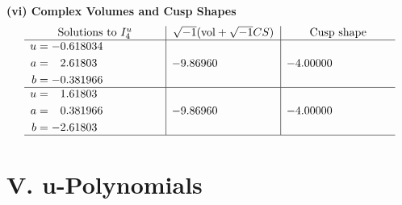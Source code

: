 \documentclass[1p]{elsarticle_modified}
\theoremstyle{definition}
\newcommand{\I}{\sqrt{-1}}
\begin{document}
\newpage\flushleft \textbf{(vi) Complex Volumes and Cusp Shapes}
$$\begin{array}{c|c|c}  
\text{Solutions to }I^u_{4}& \I (\text{vol} + \sqrt{-1}CS) & \text{Cusp shape}\\
 \hline 
\begin{aligned}
u &= -0.618034\phantom{ +0.000000I} \\
a &= \phantom{-}2.61803\phantom{ +0.000000I} \\
b &= -0.381966\phantom{ +0.000000I}\end{aligned}
 & -9.86960\phantom{ +0.000000I} & -4.00000\phantom{ +0.000000I} \\ \hline\begin{aligned}
u &= \phantom{-}1.61803\phantom{ +0.000000I} \\
a &= \phantom{-}0.381966\phantom{ +0.000000I} \\
b &= -2.61803\phantom{ +0.000000I}\end{aligned}
 & -9.86960\phantom{ +0.000000I} & -4.00000\phantom{ +0.000000I}\\
 \hline 
 \end{array}$$\newpage
\newpage\renewcommand{\arraystretch}{1}
\centering \section*{ V. u-Polynomials}
\end{document}
